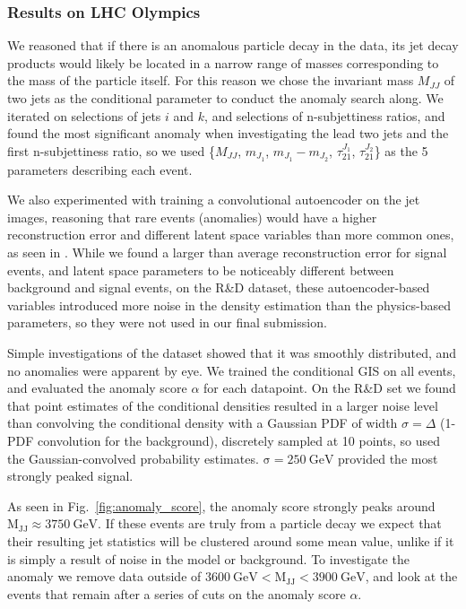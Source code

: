\documentclass[a4paper,11pt]{article}
\begin{document}
\subsubsection{Results on LHC Olympics}
\label{sec:results}

We reasoned that if there is an anomalous particle decay in the data, its jet decay products would likely be located in a narrow range of masses corresponding to the mass of the particle itself. For this reason we chose the invariant mass $M_{JJ}$ of two jets as the conditional parameter to conduct the anomaly search along. We iterated on selections of jets $i$ and $k$, and selections of n-subjettiness ratios, and found the most significant anomaly when investigating the lead two jets and the first n-subjettiness ratio, so we used \{$M_{JJ}$, $m_{J_1}$, $m_{J_1}-m_{J_2}$, $\tau_{21}^{J_1}$,  $\tau_{21}^{J_2}$\} as the 5 parameters describing each event. 

We also experimented with training a convolutional autoencoder on the jet images, reasoning that rare events (anomalies) would have a higher reconstruction error and different latent space variables than more common ones, as seen in \cite{Farina:2018fyg}. While we found a larger than average reconstruction error for signal events, and latent space parameters to be noticeably different between background and signal events, on the R\&D dataset, these autoencoder-based variables introduced more noise in the  density estimation than the physics-based parameters, so they were not used in our final submission. 

Simple investigations of the dataset showed that it was smoothly distributed, and no anomalies were apparent by eye. We trained the conditional GIS on all events, and evaluated the anomaly score $\alpha$ for each datapoint. On the R\&D set we found that point estimates of the conditional densities resulted in a larger noise level than convolving the conditional density with a Gaussian PDF of width $\sigma=\Delta$ (1-PDF convolution for the background), discretely sampled at 10 points, so used the Gaussian-convolved probability estimates. $\mathrm{\sigma=250\ GeV}$ provided the most strongly peaked signal. 

As seen in Fig.~\ref{fig:anomaly_score}, the anomaly score strongly peaks around $\mathrm{M_{JJ}\approx 3750\ GeV}$. If these events are truly from a particle decay we expect that their resulting jet statistics will be clustered around some mean value, unlike if it is simply a result of noise in the model or background. To investigate the anomaly we remove data outside of $\mathrm{3600\ GeV < M_{JJ} < 3900\ GeV}$, and look at the events that remain after a series of cuts on the anomaly score $\alpha$. 
\end{document}
